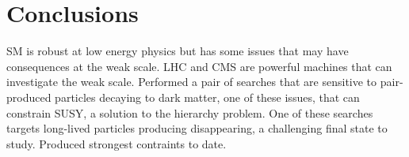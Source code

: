 \chapter{Conclusions}

SM is robust at low energy physics but has some issues that may have consequences at the weak scale.
LHC and CMS are powerful machines that can investigate the weak scale.
Performed a pair of searches that are sensitive to pair-produced particles decaying to dark matter, one of these issues, that can constrain SUSY, a solution to the hierarchy problem.
One of these searches targets long-lived particles producing disappearing, a challenging final state to study.
Produced strongest contraints to date.
